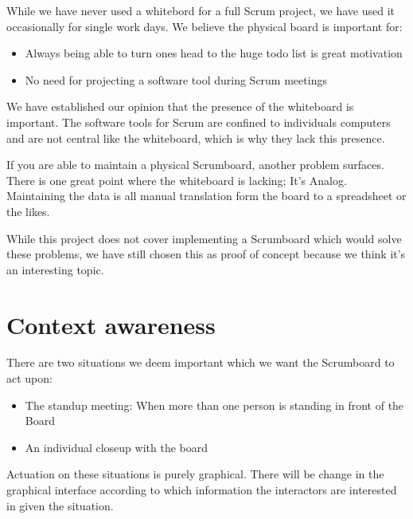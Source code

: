 \documentclass[]{report}
\begin{document}
While we have never used a whitebord for a full Scrum project, we have used it occasionally for single work days. We believe the physical board is important for:

\begin{itemize}
\item Always being able to turn ones head to the huge todo list is great motivation
\item No need for projecting a software tool during Scrum meetings
\end{itemize}


We have established our opinion that the presence of the whiteboard is important. The software tools for Scrum are confined to individuals computers and are not central like the whiteboard, which is why they lack this presence.

If you are able to maintain a physical Scrumboard, another problem surfaces. There is one great point where the whiteboard is lacking; It's Analog. Maintaining the data is all manual translation form the board to a spreadsheet or the likes.



While this project does not cover implementing a Scrumboard which would solve these problems, we have still chosen this as proof of concept because we think it's an interesting topic.


\section{Context awareness}

There are two situations we deem important which we want the Scrumboard to act upon:

\begin{itemize}
\item The standup meeting: When more than one person is standing in front of the Board
\item An individual closeup with the board
\end{itemize}

Actuation on these situations is purely graphical. There will be change in the graphical interface according to which information the interactors are interested in given the situation.
\end{document}
